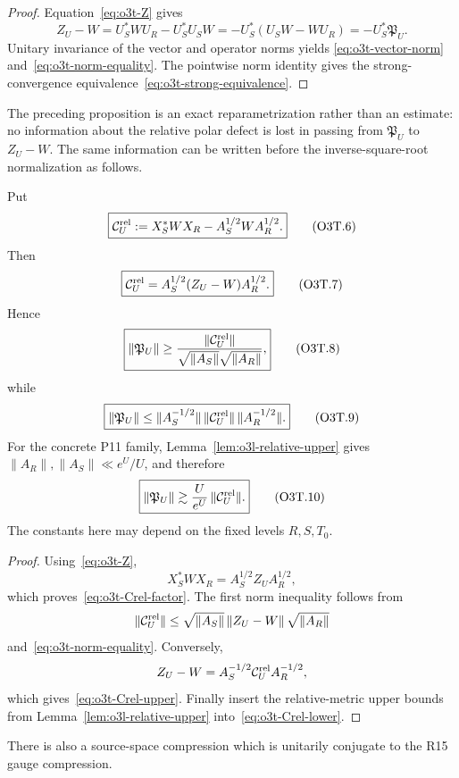 \begin{proof}
Equation~\eqref{eq:o3t-Z} gives
\[
 Z_U-W
 =U_S^*WU_R-U_S^*U_SW
 =-U_S^*(U_SW-WU_R)
 =-U_S^*\mathfrak P_U.
\]
Unitary invariance of the vector and operator norms yields
\eqref{eq:o3t-vector-norm} and~\eqref{eq:o3t-norm-equality}.  The pointwise norm
identity gives the strong-convergence equivalence~\eqref{eq:o3t-strong-equivalence}.
\end{proof}

The preceding proposition is an exact reparametrization rather than an estimate: no
information about the relative polar defect is lost in passing from $\mathfrak P_U$ to
$Z_U-W$.  The same information can be written before the inverse-square-root
normalization as follows.

\begin{corollary}
\label{cor:o3t-Crel}
Put
\[
 \boxed{
 \mathcal C_U^{\rm rel}
 :=X_S^*WX_R-A_S^{1/2}WA_R^{1/2}.
 }
\tag{O3T.6}\label{eq:o3t-Crel}
\]
Then
\[
 \boxed{
 \mathcal C_U^{\rm rel}
 =A_S^{1/2}(Z_U-W)A_R^{1/2}.
 }
\tag{O3T.7}\label{eq:o3t-Crel-factor}
\]
Hence
\[
 \boxed{
 \|\mathfrak P_U\|
 \ge
 \frac{\|\mathcal C_U^{\rm rel}\|}
 {\sqrt{\|A_S\|}\sqrt{\|A_R\|}},
 }
\tag{O3T.8}\label{eq:o3t-Crel-lower}
\]
while
\[
 \boxed{
 \|\mathfrak P_U\|
 \le
 \|A_S^{-1/2}\|\,
 \|\mathcal C_U^{\rm rel}\|\,
 \|A_R^{-1/2}\|.
 }
\tag{O3T.9}\label{eq:o3t-Crel-upper}
\]
For the concrete P11 family, Lemma~\ref{lem:o3l-relative-upper} gives
$\|A_R\|,\|A_S\|\ll e^U/U$, and therefore
\[
 \boxed{
 \|\mathfrak P_U\|
 \gtrsim
 \frac{U}{e^U}\,\|\mathcal C_U^{\rm rel}\|.
 }
\tag{O3T.10}\label{eq:o3t-P11-weighted-lower}
\]
The constants here may depend on the fixed levels $R,S,T_0$.
\end{corollary}

\begin{proof}
Using~\eqref{eq:o3t-Z},
\[
 X_S^*WX_R
 =A_S^{1/2}Z_UA_R^{1/2},
\]
which proves~\eqref{eq:o3t-Crel-factor}.  The first norm inequality follows from
\[
 \|\mathcal C_U^{\rm rel}\|
 \le
 \sqrt{\|A_S\|}\,\|Z_U-W\|\,\sqrt{\|A_R\|}
\]
and~\eqref{eq:o3t-norm-equality}.  Conversely,
\[
 Z_U-W
 =A_S^{-1/2}\mathcal C_U^{\rm rel}A_R^{-1/2},
\]
which gives~\eqref{eq:o3t-Crel-upper}.  Finally insert the relative-metric upper bounds
from Lemma~\ref{lem:o3l-relative-upper} into~\eqref{eq:o3t-Crel-lower}.
\end{proof}

There is also a source-space compression which is unitarily conjugate to the R15 gauge
compression.

